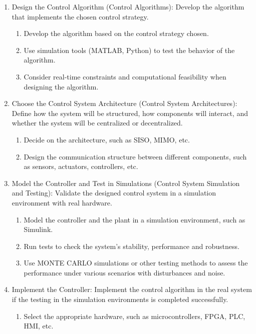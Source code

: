 \documentclass{article}
\begin{document}
\begin{enumerate}
\begin{enumerate}[label=\roman*.]
        \end{enumerate}
    \item Design the Control Algorithm (Control Algorithms): Develop the algorithm that implements the chosen control strategy.
        \begin{enumerate}[label=\roman*.]
            \item Develop the algorithm based on the control strategy chosen.
            \item Use simulation tools (MATLAB, Python) to test the behavior of the algorithm.
            \item Consider real-time constraints and computational feasibility when designing the algorithm.
        \end{enumerate}
    \item Choose the Control System Architecture (Control System Architectures): Define how the system will be structured, how components will interact, and whether the system will be centralized or decentralized.
        \begin{enumerate}[label=\roman*.]
            \item Decide on the architecture, such as SISO, MIMO, etc.
            \item Design the communication structure between different components, such as sensors, actuators, controllers, etc.
        \end{enumerate}
    \item Model the Controller and Test in Simulations (Control System Simulation and Testing): Validate the designed control system in a simulation environment with real hardware.
        \begin{enumerate}[label=\roman*.]
            \item Model the controller and the plant in a simulation environment, such as Simulink.
            \item Run tests to check the system's stability, performance and robustness.
            \item Use MONTE CARLO simulations or other testing methods to assess the performance under various scenarios with disturbances and noise.
        \end{enumerate}
    \item Implement the Controller: Implement the control algorithm in the real system if the testing in the simulation environments is completed successfully.
        \begin{enumerate}[label=\roman*.]
            \item Select the appropriate hardware, such as microcontrollers, FPGA, PLC, HMI, etc.

\end{enumerate}
\end{enumerate}
\end{document}
